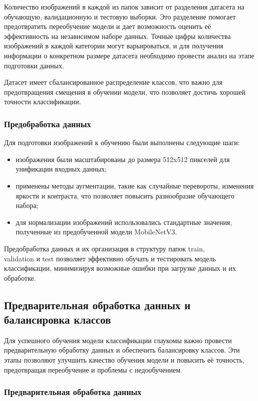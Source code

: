 {    Количество изображений в каждой из папок зависит от разделения датасета на обучающую, валидационную и тестовую выборки. Это разделение помогает предотвратить переобучение модели и дает возможность оценить её эффективность на независимом наборе данных. Точные цифры количества изображений в каждой категории могут варьироваться, и для получения информации о конкретном размере датасета необходимо провести анализ на этапе подготовки данных. 

    Датасет имеет сбалансированное распределение классов, что важно для предотвращения смещения в обучении модели, что позволяет достичь хорошей точности классификации.

    \subsubsection*{Предобработка данных}

    Для подготовки изображений к обучению были выполнены следующие шаги:
    \begin{itemize}
        \item изображения были масштабированы до размера 512x512 пикселей для унификации входных данных;
        \item применены методы аугментации, такие как случайные перевороты, изменения яркости и контраста, что позволяет повысить разнообразие обучающего набора;
        \item для нормализации изображений использовались стандартные значения, полученные из предобученной модели MobileNetV3.
    \end{itemize}

    Предобработка данных и их организация в структуру папок train, \\ validation и test позволяет эффективно обучать и тестировать модель классификации, минимизируя возможные ошибки при загрузке данных и их обработке.

    \subsection{Предварительная обработка данных и балансировка классов}

    Для успешного обучения модели классификации глаукомы важно провести предварительную обработку данных и обеспечить балансировку классов. Эти этапы позволяют улучшить качество обучения модели и повысить её точность, предотвращая переобучение и проблемы с недообучением.
    
    \subsubsection*{Предварительная обработка данных}
    
}
